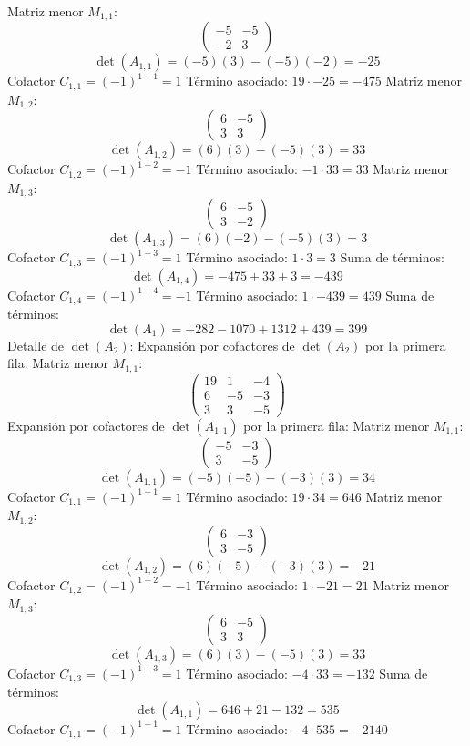 \documentclass{article}
\begin{document}
Matriz menor $M_{1,1}$:
\[\begin{pmatrix}-5 & -5 \\ -2 & 3\end{pmatrix}\]
\[\det(A_{1,1}) = (-5)(3) - (-5)(-2) = -25\]
Cofactor $C_{1,1} = (-1)^{1+1} = 1$
Término asociado: $ 19 \cdot -25 = -475 $
Matriz menor $M_{1,2}$:
\[\begin{pmatrix}6 & -5 \\ 3 & 3\end{pmatrix}\]
\[\det(A_{1,2}) = (6)(3) - (-5)(3) = 33\]
Cofactor $C_{1,2} = (-1)^{1+2} = -1$
Término asociado: $ -1 \cdot 33 = 33 $
Matriz menor $M_{1,3}$:
\[\begin{pmatrix}6 & -5 \\ 3 & -2\end{pmatrix}\]
\[\det(A_{1,3}) = (6)(-2) - (-5)(3) = 3\]
Cofactor $C_{1,3} = (-1)^{1+3} = 1$
Término asociado: $ 1 \cdot 3 = 3 $
Suma de términos:
\[\det(A_{1,4}) = -475 + 33 + 3 = -439\]
Cofactor $C_{1,4} = (-1)^{1+4} = -1$
Término asociado: $ 1 \cdot -439 = 439 $
Suma de términos:
\[\det(A_{1}) = -282 - 1070 + 1312 + 439 = 399\]
Detalle de $\det(A_{2})$:
Expansión por cofactores de $\det(A_{2})$ por la primera fila:
Matriz menor $M_{1,1}$:
\[\begin{pmatrix}19 & 1 & -4 \\ 6 & -5 & -3 \\ 3 & 3 & -5\end{pmatrix}\]
Expansión por cofactores de $\det(A_{1,1})$ por la primera fila:
Matriz menor $M_{1,1}$:
\[\begin{pmatrix}-5 & -3 \\ 3 & -5\end{pmatrix}\]
\[\det(A_{1,1}) = (-5)(-5) - (-3)(3) = 34\]
Cofactor $C_{1,1} = (-1)^{1+1} = 1$
Término asociado: $ 19 \cdot 34 = 646 $
Matriz menor $M_{1,2}$:
\[\begin{pmatrix}6 & -3 \\ 3 & -5\end{pmatrix}\]
\[\det(A_{1,2}) = (6)(-5) - (-3)(3) = -21\]
Cofactor $C_{1,2} = (-1)^{1+2} = -1$
Término asociado: $ 1 \cdot -21 = 21 $
Matriz menor $M_{1,3}$:
\[\begin{pmatrix}6 & -5 \\ 3 & 3\end{pmatrix}\]
\[\det(A_{1,3}) = (6)(3) - (-5)(3) = 33\]
Cofactor $C_{1,3} = (-1)^{1+3} = 1$
Término asociado: $ -4 \cdot 33 = -132 $
Suma de términos:
\[\det(A_{1,1}) = 646 + 21 - 132 = 535\]
Cofactor $C_{1,1} = (-1)^{1+1} = 1$
Término asociado: $ -4 \cdot 535 = -2140 $
\end{document}
